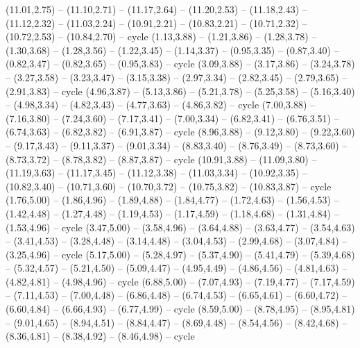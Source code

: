 \expandafter\def\csname geo:Tissot:k12\endcsname{
  (11.01,2.75) -- (11.10,2.71) -- (11.17,2.64) -- (11.20,2.53) -- (11.18,2.43) -- (11.12,2.32) -- (11.03,2.24) -- (10.91,2.21) -- (10.83,2.21) -- (10.71,2.32) -- (10.72,2.53) -- (10.84,2.70) -- cycle}
\expandafter\def\csname geo:Tissot:k13\endcsname{
  (1.13,3.88) -- (1.21,3.86) -- (1.28,3.78) -- (1.30,3.68) -- (1.28,3.56) -- (1.22,3.45) -- (1.14,3.37) -- (0.95,3.35) -- (0.87,3.40) -- (0.82,3.47) -- (0.82,3.65) -- (0.95,3.83) -- cycle}
\expandafter\def\csname geo:Tissot:k14\endcsname{
  (3.09,3.88) -- (3.17,3.86) -- (3.24,3.78) -- (3.27,3.58) -- (3.23,3.47) -- (3.15,3.38) -- (2.97,3.34) -- (2.82,3.45) -- (2.79,3.65) -- (2.91,3.83) -- cycle}
\expandafter\def\csname geo:Tissot:k15\endcsname{
  (4.96,3.87) -- (5.13,3.86) -- (5.21,3.78) -- (5.25,3.58) -- (5.16,3.40) -- (4.98,3.34) -- (4.82,3.43) -- (4.77,3.63) -- (4.86,3.82) -- cycle}
\expandafter\def\csname geo:Tissot:k16\endcsname{
  (7.00,3.88) -- (7.16,3.80) -- (7.24,3.60) -- (7.17,3.41) -- (7.00,3.34) -- (6.82,3.41) -- (6.76,3.51) -- (6.74,3.63) -- (6.82,3.82) -- (6.91,3.87) -- cycle}
\expandafter\def\csname geo:Tissot:k17\endcsname{
  (8.96,3.88) -- (9.12,3.80) -- (9.22,3.60) -- (9.17,3.43) -- (9.11,3.37) -- (9.01,3.34) -- (8.83,3.40) -- (8.76,3.49) -- (8.73,3.60) -- (8.73,3.72) -- (8.78,3.82) -- (8.87,3.87) -- cycle}
\expandafter\def\csname geo:Tissot:k18\endcsname{
  (10.91,3.88) -- (11.09,3.80) -- (11.19,3.63) -- (11.17,3.45) -- (11.12,3.38) -- (11.03,3.34) -- (10.92,3.35) -- (10.82,3.40) -- (10.71,3.60) -- (10.70,3.72) -- (10.75,3.82) -- (10.83,3.87) -- cycle}
\expandafter\def\csname geo:Tissot:k19\endcsname{
  (1.76,5.00) -- (1.86,4.96) -- (1.89,4.88) -- (1.84,4.77) -- (1.72,4.63) -- (1.56,4.53) -- (1.42,4.48) -- (1.27,4.48) -- (1.19,4.53) -- (1.17,4.59) -- (1.18,4.68) -- (1.31,4.84) -- (1.53,4.96) -- cycle}
\expandafter\def\csname geo:Tissot:k20\endcsname{
  (3.47,5.00) -- (3.58,4.96) -- (3.64,4.88) -- (3.63,4.77) -- (3.54,4.63) -- (3.41,4.53) -- (3.28,4.48) -- (3.14,4.48) -- (3.04,4.53) -- (2.99,4.68) -- (3.07,4.84) -- (3.25,4.96) -- cycle}
\expandafter\def\csname geo:Tissot:k21\endcsname{
  (5.17,5.00) -- (5.28,4.97) -- (5.37,4.90) -- (5.41,4.79) -- (5.39,4.68) -- (5.32,4.57) -- (5.21,4.50) -- (5.09,4.47) -- (4.95,4.49) -- (4.86,4.56) -- (4.81,4.63) -- (4.82,4.81) -- (4.98,4.96) -- cycle}
\expandafter\def\csname geo:Tissot:k22\endcsname{
  (6.88,5.00) -- (7.07,4.93) -- (7.19,4.77) -- (7.17,4.59) -- (7.11,4.53) -- (7.00,4.48) -- (6.86,4.48) -- (6.74,4.53) -- (6.65,4.61) -- (6.60,4.72) -- (6.60,4.84) -- (6.66,4.93) -- (6.77,4.99) -- cycle}
\expandafter\def\csname geo:Tissot:k23\endcsname{
  (8.59,5.00) -- (8.78,4.95) -- (8.95,4.81) -- (9.01,4.65) -- (8.94,4.51) -- (8.84,4.47) -- (8.69,4.48) -- (8.54,4.56) -- (8.42,4.68) -- (8.36,4.81) -- (8.38,4.92) -- (8.46,4.98) -- cycle}
